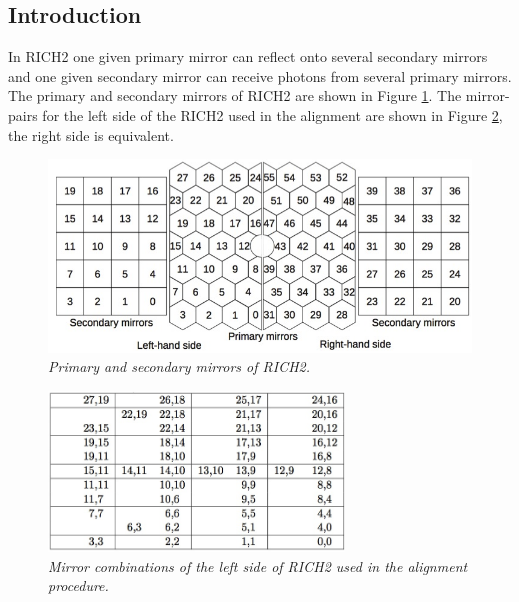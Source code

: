 \subsection{Introduction}
In RICH2 one given primary mirror can reflect onto several secondary mirrors and one given secondary mirror can receive photons from several primary mirrors. The primary and secondary mirrors of RICH2 are shown in Figure \ref{fig:rich2mirr}. The mirror-pairs for the left side of the RICH2 used in the alignment are shown in Figure \ref{fig:rich2combis}, the right side is equivalent. 
\begin{figure}[!h]
	\vspace*{-0.cm}
	\begin{center}
		\includegraphics[width=1.\textwidth]{rich2mirrors.png}
		\vspace*{-1.cm}
	\end{center}
	\caption{\textit{Primary and secondary mirrors of RICH2.}}
	\label{fig:rich2mirr}
\end{figure}

\begin{figure}[!h]
	\vspace*{-0.cm}
	\begin{center}
		\includegraphics[width=0.7\textwidth]{rich2combis.png}
		\vspace*{-0.5cm}
	\end{center}
	\caption{\textit{Mirror combinations of the left side of RICH2 used in the alignment procedure.}}
	\label{fig:rich2combis}
\end{figure}

